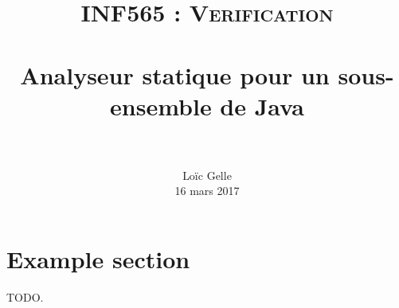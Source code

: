 \documentclass[paper=a4, fontsize=11pt]{scrartcl}
\title{	
		\usefont{OT1}{bch}{b}{n}
		\normalfont \normalsize \textsc{INF565 : Verification} \\ [25pt]
		\horrule{0.5pt} \\[0.4cm]
		\huge Analyseur statique pour un sous-ensemble de Java \\
		\horrule{2pt} \\[0.5cm]
}
\author{
		\normalfont 								\normalsize
        Lo\"{i}c Gelle\\[-3pt]		\normalsize
        16 mars 2017
}
\date{}
\numberwithin{figure}{section}			%
\numberwithin{table}{section}				%
\begin{document}
\maketitle
\section{Example section}

TODO.
\end{document}
